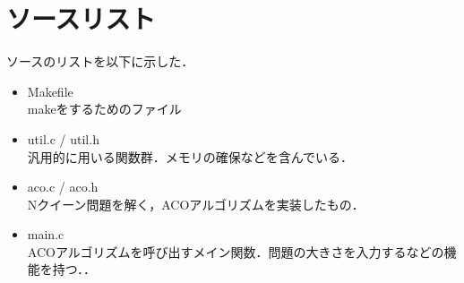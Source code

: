 \documentclass{jarticle}
\begin{document}
\appendix
\section{ソースリスト}

ソースのリストを以下に示した．

\begin{itemize}
	\item Makefile \\
		makeをするためのファイル
	\item util.c / util.h \\
		汎用的に用いる関数群．メモリの確保などを含んでいる．
	\item aco.c / aco.h \\
		Nクイーン問題を解く，ACOアルゴリズムを実装したもの．
	\item main.c \\
		ACOアルゴリズムを呼び出すメイン関数．問題の大きさを入力するなどの機能を持つ．．
\end{itemize}
\end{document}
